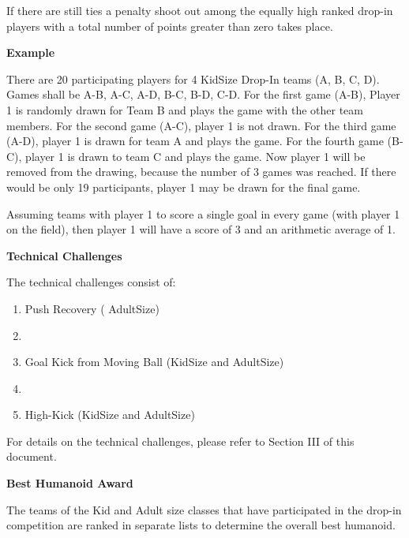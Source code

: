 If there are still ties a penalty shoot out among the equally high ranked drop-in players with a total number of points greater than zero takes place.

\bigskip 
 
{\bfseries Example}
 
There are 20 participating players for 4 KidSize Drop-In teams (A, B, C, D). Games shall be A-B, A-C, A-D, B-C, B-D, C-D. For the first game (A-B), Player 1 is randomly drawn for Team B and plays the game with the other team members. For the second game (A-C), player 1 is not drawn. For the third game (A-D), player 1 is drawn for team A and plays the game. For the fourth game (B-C), player 1 is drawn to team C and plays the game. Now player 1 will be removed from the drawing, because the number of 3 games was reached. If there would be only 19 participants, player 1 may be drawn for the final game.

Assuming teams with player 1 to score a single goal in every game (with player 1 on the field), then player 1 will have a score of 3 and an arithmetic average of 1.

\bigskip

{\bfseries Technical Challenges}

\headlinebox

The technical challenges consist of:

\begin{enumerate}
\item Push Recovery ( AdultSize)
\item {}
\item Goal Kick from Moving Ball (KidSize and AdultSize)
\item {} 
\item High-Kick (KidSize and AdultSize)
\end{enumerate}

For details on the technical challenges, please refer to Section III of this document.

\bigskip

\newpage
{\bfseries Best Humanoid Award}

\headlinebox
 
The teams of the Kid and Adult size classes that have
participated in the drop-in competition are ranked in separate lists to
determine the overall best humanoid.


